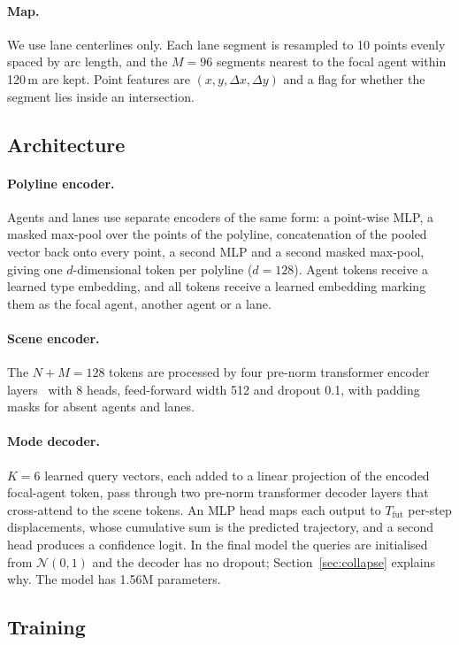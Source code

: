 \documentclass[10pt]{article}
\begin{document}
\paragraph{Map.} We use lane centerlines only. Each lane segment is resampled to 10 points
evenly spaced by arc length, and the $M=96$ segments nearest to the focal agent within 120\,m
are kept. Point features are $(x, y, \Delta x, \Delta y)$ and a flag for whether the segment
lies inside an intersection.

\subsection{Architecture}

\paragraph{Polyline encoder.} Agents and lanes use separate encoders of the same form: a
point-wise MLP, a masked max-pool over the points of the polyline, concatenation of the pooled
vector back onto every point, a second MLP and a second masked max-pool, giving one
$d$-dimensional token per polyline ($d=128$). Agent tokens receive a learned type embedding,
and all tokens receive a learned embedding marking them as the focal agent, another agent or
a lane.

\paragraph{Scene encoder.} The $N+M=128$ tokens are processed by four pre-norm transformer
encoder layers~\cite{vaswani2017attention} with 8 heads, feed-forward width 512 and dropout
0.1, with padding masks for absent agents and lanes.

\paragraph{Mode decoder.} $K=6$ learned query vectors, each added to a linear projection of
the encoded focal-agent token, pass through two pre-norm transformer decoder layers that
cross-attend to the scene tokens. An MLP head maps each output to $T_\text{fut}$ per-step
displacements, whose cumulative sum is the predicted trajectory, and a second head produces a
confidence logit. In the final model the queries are initialised from $\mathcal{N}(0, 1)$ and
the decoder has no dropout; Section~\ref{sec:collapse} explains why. The model has 1.56M
parameters.

\subsection{Training}
\end{document}
